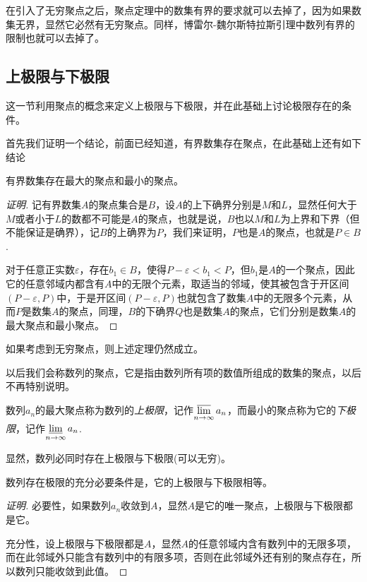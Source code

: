 在引入了无穷聚点之后，聚点定理中的数集有界的要求就可以去掉了，因为如果数集无界，显然它必然有无穷聚点。同样，博雷尔-魏尔斯特拉斯引理中数列有界的限制也就可以去掉了。

\subsection{上极限与下极限}
\label{sec:upper-limit-and-lower-limit}

这一节利用聚点的概念来定义上极限与下极限，并在此基础上讨论极限存在的条件。

首先我们证明一个结论，前面已经知道，有界数集存在聚点，在此基础上还有如下结论
\begin{theorem}
  有界数集存在最大的聚点和最小的聚点。
\end{theorem}

\begin{proof}[证明]
  记有界数集$A$的聚点集合是$B$，设$A$的上下确界分别是$M$和$L$，显然任何大于$M$或者小于$L$的数都不可能是$A$的聚点，也就是说，$B$也以$M$和$L$为上界和下界（但不能保证是确界），记$B$的上确界为$P$，我们来证明，$P$也是$A$的聚点，也就是$P \in B$.

  对于任意正实数$\varepsilon$，存在$b_1 \in B$，使得$P-\varepsilon < b_1 < P$，但$b_1$是$A$的一个聚点，因此它的任意邻域内都含有$A$中的无限个元素，取适当的邻域，使其被包含于开区间$(P-\varepsilon,P)$中，于是开区间$(P-\varepsilon,P)$也就包含了数集$A$中的无限多个元素，从而$P$是数集$A$的聚点，同理，$B$的下确界$Q$也是数集$A$的聚点，它们分别是数集$A$的最大聚点和最小聚点。
\end{proof}

如果考虑到无穷聚点，则上述定理仍然成立。

以后我们会称数列的聚点，它是指由数列所有项的数值所组成的数集的聚点，以后不再特别说明。

\begin{definition}
  数列$a_n$的最大聚点称为数列的\emph{上极限}，记作$\varlimsup\limits_{n \to \infty}a_n$，而最小的聚点称为它的\emph{下极限}，记作$\varliminf\limits_{n \to \infty} a_n$.
\end{definition}

显然，数列必同时存在上极限与下极限(可以无穷)。

\begin{theorem}
数列存在极限的充分必要条件是，它的上极限与下极限相等。  
\end{theorem}

\begin{proof}[证明]
  必要性，如果数列$a_n$收敛到$A$，显然$A$是它的唯一聚点，上极限与下极限都是它。

  充分性，设上极限与下极限都是$A$，显然$A$的任意邻域内含有数列中的无限多项，而在此邻域外只能含有数列中的有限多项，否则在此邻域外还有别的聚点存在，所以数列只能收敛到此值。
\end{proof}

